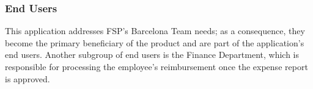 \subsubsection{End Users}

This application addresses FSP's Barcelona Team needs; as a consequence, they become the primary beneficiary of the product and are part of the application's end users. Another subgroup of end users is the Finance Department, which is responsible for processing the employee's reimbursement once the expense report is approved. 
